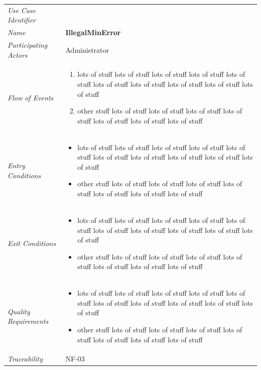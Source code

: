 \documentclass[12pt,letterpaper]{article}
\begin{document}
\begin{center}
	\begin{tabu} to 
		\toprule
		Use Case Identifier & \illegalminerror{} \\
		Name & {\bf IllegalMinError} \\
		Participating Actors & Administrator \\
		Flow of Events & 
	    \begin{enumerate}[topsep=-1em]
		    \item lots of stuff lots of stuff lots of stuff lots of stuff lots of stuff lots of stuff lots of stuff lots of stuff lots of stuff lots of stuff
		    \item other stuff lots of stuff lots of stuff lots of stuff lots of stuff lots of stuff lots of stuff lots of stuff
		\end{enumerate} \\

		Entry Conditions &
		\begin{itemize}[topsep=-1em]
		    \item lots of stuff lots of stuff lots of stuff lots of stuff lots of stuff lots of stuff lots of stuff lots of stuff lots of stuff lots of stuff
		    \item other stuff lots of stuff lots of stuff lots of stuff lots of stuff lots of stuff lots of stuff lots of stuff
        \end{itemize} \\

		Exit Conditions &
		\begin{itemize}[topsep=-1em]
		    \item lots of stuff lots of stuff lots of stuff lots of stuff lots of stuff lots of stuff lots of stuff lots of stuff lots of stuff lots of stuff
		    \item other stuff lots of stuff lots of stuff lots of stuff lots of stuff lots of stuff lots of stuff lots of stuff
        \end{itemize} \\

		Quality Requirements &
		\begin{itemize}[topsep=-1em]
		    \item lots of stuff lots of stuff lots of stuff lots of stuff lots of stuff lots of stuff lots of stuff lots of stuff lots of stuff lots of stuff
		    \item other stuff lots of stuff lots of stuff lots of stuff lots of stuff lots of stuff lots of stuff lots of stuff
        \end{itemize} \\

		Traceability & NF-03 \\
		\toprule
	\end{tabu}
\end{center}
\end{document}
